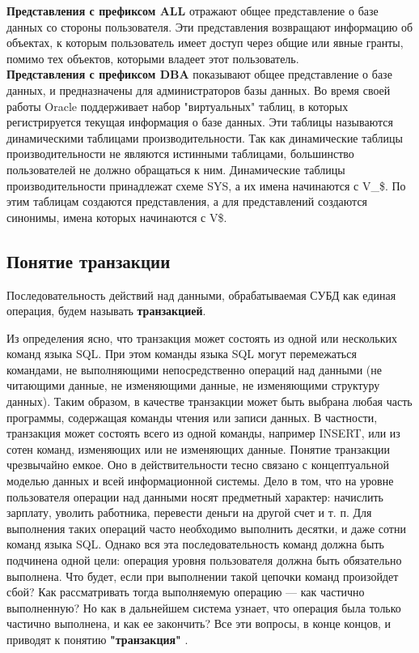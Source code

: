 \textbf{Представления с префиксом ALL} отражают общее представление о базе
данных со стороны пользователя. Эти представления возвращают информацию об объектах, к которым пользователь имеет доступ через общие или явные гранты, помимо тех объектов, которыми владеет этот пользователь. ~\\

\textbf{Представления с префиксом DBA} показывают общее представление о базе
данных, и предназначены для администраторов базы данных.
Во время своей работы Oracle поддерживает набор "виртуальных" таблиц,
в которых регистрируется текущая информация о базе данных. Эти таблицы
называются динамическими таблицами производительности. Так как динамические таблицы производительности не являются истинными таблицами,
большинство пользователей не должно обращаться к ним. Динамические
таблицы производительности принадлежат схеме SYS, а их имена начинаются
с V\_\$. По этим таблицам создаются представления, а для представлений создаются синонимы, имена которых начинаются с V\$.

\subsection{Понятие транзакции}
\begin{grayquote}
Последовательность действий над данными, обрабатываемая СУБД как единая
операция, будем называть \textbf{транзакцией}.
\end{grayquote}
Из определения ясно, что транзакция может состоять из одной или нескольких команд языка SQL. При этом команды языка SQL могут перемежаться
командами, не выполняющими непосредственно операций над данными (не
читающими данные, не изменяющими данные, не изменяющими структуру
данных). Таким образом, в качестве транзакции может быть выбрана любая
часть программы, содержащая команды чтения или записи данных. В частности, транзакция может состоять всего из одной команды, например INSERT,
или из сотен команд, изменяющих или не изменяющих данные.
Понятие транзакции чрезвычайно емкое. Оно в действительности тесно связано с концептуальной моделью данных и всей информационной системы.
Дело в том, что на уровне пользователя операции над данными носят предметный характер: начислить зарплату, уволить работника, перевести деньги
на другой счет и т. п. Для выполнения таких операций часто необходимо выполнить десятки, и даже сотни команд языка SQL. Однако вся эта последовательность команд должна быть подчинена одной цели: операция уровня
пользователя должна быть обязательно выполнена. Что будет, если при выполнении такой цепочки команд произойдет сбой? Как рассматривать тогда
выполняемую операцию — как частично выполненную? Но как в дальнейшем система узнает, что операция была только частично выполнена, и как ее
закончить? Все эти вопросы, в конце концов, и приводят к понятию \textbf{"транзакция"} \autocite{Pirogov2009}.

